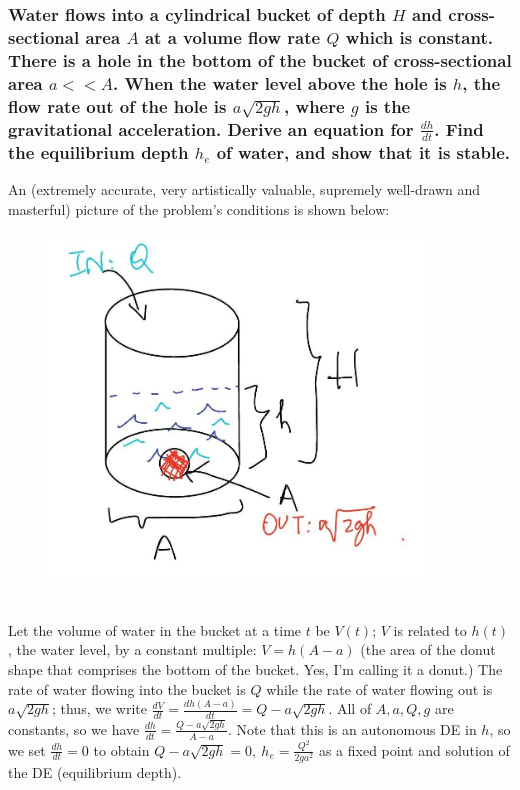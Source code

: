 \documentclass{article}
\begin{document}
\subsubsection*{Water flows into a cylindrical bucket of depth $H$ and cross-sectional area $A$ at a volume flow rate $Q$ which is constant. There is a hole in the bottom of the bucket of cross-sectional area $a << A$. When the water level above the hole is $h$, the flow rate out of the hole is $a\sqrt{2gh}$, where $g$ is the gravitational acceleration. Derive an equation for $\frac{dh}{dt}$. Find the equilibrium depth $h_e$ of water, and show that it is stable.}
An (extremely accurate, very artistically valuable, supremely well-drawn and masterful) picture of the problem's conditions is shown below:
\begin{figure}[h]
    \centering
    \includegraphics[width=10cm]{DE-ch2-11-1.jpg}
\end{figure}\\
Let the volume of water in the bucket at a time $t$ be $V(t)$; $V$ is related to $h(t)$, the water level, by a constant multiple: $V = h(A-a)$ (the area of the donut shape that comprises the bottom of the bucket. Yes, I'm calling it a donut.) The rate of water flowing into the bucket is $Q$ while the rate of water flowing out is $a\sqrt{2gh}$; thus, we write $\frac{dV}{dt} = \frac{dh(A-a)}{dt} = Q-a\sqrt{2gh}$. All of $A, a, Q, g$ are constants, so we have $\frac{dh}{dt} = \frac{Q-a\sqrt{2gh}}{A-a}$. 
 Note that this is an autonomous DE in $h$, so we set $\frac{dh}{dt} = 0$ to obtain $Q-a\sqrt{2gh} = 0,\ h_e = \frac{Q^2}{2ga^2}$ as a fixed point and solution of the DE (equilibrium depth). \\ \\
\end{document}
